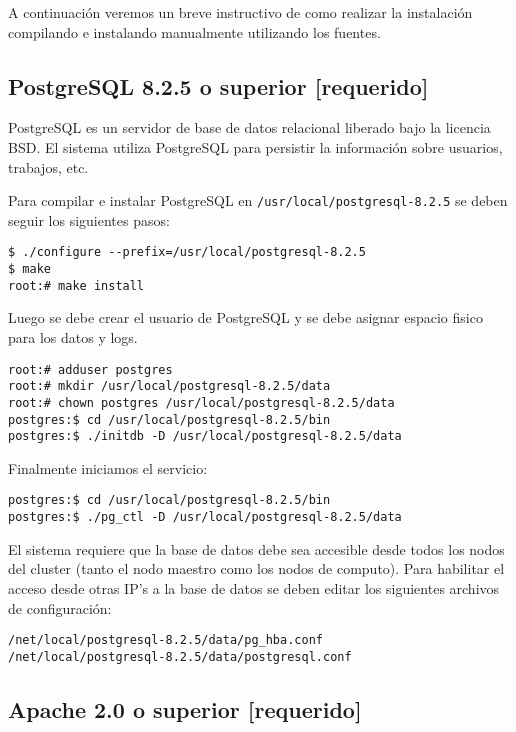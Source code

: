 \documentclass[a4paper,10pt,spanish]{article}
\begin{document}
A continuaci\'{o}n veremos un breve instructivo de como realizar la instalaci\'{o}n compilando e instalando manualmente utilizando los fuentes.

\subsection{PostgreSQL 8.2.5 o superior \small{[requerido]}}

PostgreSQL\cite{postgres} es un servidor de base de datos relacional liberado bajo la licencia BSD. El sistema utiliza PostgreSQL para persistir la informaci\'{o}n sobre usuarios, trabajos, etc.

Para compilar e instalar PostgreSQL en \mbox{\texttt{/usr/local/postgresql-8.2.5}} se deben seguir los siguientes pasos:

\begin{verbatim}
$ ./configure --prefix=/usr/local/postgresql-8.2.5
$ make
root:# make install
\end{verbatim}

Luego se debe crear el usuario de PostgreSQL y se debe asignar espacio fisico para los datos y logs.

\begin{verbatim}
root:# adduser postgres 
root:# mkdir /usr/local/postgresql-8.2.5/data 
root:# chown postgres /usr/local/postgresql-8.2.5/data 
postgres:$ cd /usr/local/postgresql-8.2.5/bin
postgres:$ ./initdb -D /usr/local/postgresql-8.2.5/data 
\end{verbatim}

Finalmente iniciamos el servicio:

\begin{verbatim}
postgres:$ cd /usr/local/postgresql-8.2.5/bin
postgres:$ ./pg_ctl -D /usr/local/postgresql-8.2.5/data
\end{verbatim}

El sistema requiere que la base de datos debe sea accesible desde todos los nodos del cluster (tanto el nodo maestro como los nodos de computo). Para habilitar el acceso desde otras IP's a la base de datos se deben editar los siguientes archivos de configuraci\'{o}n:
\begin{verbatim}
/net/local/postgresql-8.2.5/data/pg_hba.conf
/net/local/postgresql-8.2.5/data/postgresql.conf
\end{verbatim}

\subsection{Apache 2.0 o superior \small{[requerido]}}
\end{document}
